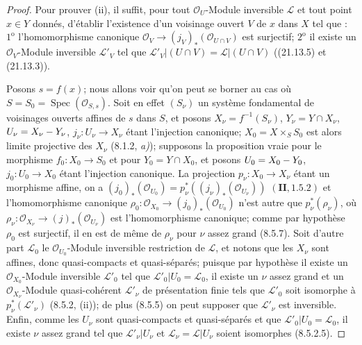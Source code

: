 \begin{proof}
Pour prouver (ii), il suffit, pour tout $\mathcal O_U$-Module inversible $\mathscr L$
et tout point $x\in Y$ donnés, d'établir l'existence d'un voisinage ouvert $V$ de $x$
dans $X$ tel que : $1^{\mathrm o}$ l'homomorphisme canonique
$\mathcal O_V\to(j_V)_*(\mathcal O_{U\cap V})$ est surjectif;
$2^{\mathrm o}$ il existe un $\mathcal O_V$-Module inversible $\mathscr L'_V$ tel que
$\mathscr L'_V|(U\cap V)=\mathscr L|(U\cap V)$ ((21.13.5) et (21.13.3)).

Posons $s=f(x)$; nous allons voir qu'on peut se borner au cas où
$S=S_0=\operatorname{Spec}(\mathcal O_{S,s})$. Soit en effet $(S_\nu)$ un système
fondamental de voisinages ouverts affines de $s$ dans $S$, et posons
$X_\nu=f^{-1}(S_\nu)$, $Y_\nu=Y\cap X_\nu$, $U_\nu=X_\nu- Y_\nu$,
$j_\nu:U_\nu\to X_\nu$ étant l'injection canonique; $X_0=X\times_S S_0$ est alors
limite projective des $X_\nu$ (8.1.2, \emph{a)}); supposons la proposition vraie pour le
morphisme $f_0:X_0\to S_0$ et pour $Y_0=Y\cap X_0$, et posons $U_0=X_0- Y_0$,
$j_0:U_0\to X_0$ étant l'injection canonique. La projection
$p_\nu:X_0\to X_\nu$ étant un morphisme affine, on a $(j_0)_*(\mathcal O_{U_0})=p_\nu^*((j_\nu)_*(\mathcal O_{U_\nu}))$
$(\mathbf{II}, 1.5.2)$ et l'homomorphisme canonique
$\rho_0:\mathcal O_{X_0}\to(j_0)_*(\mathcal O_{U_0})$ n'est autre que
$p_\nu^*(\rho_\nu)$, où
$\rho_\nu:\mathcal O_{X_\nu}\to(j)_*(\mathcal O_{U_\nu})$ est l'homomorphisme
canonique; comme par hypothèse $\rho_0$ est surjectif, il en est de même de $\rho_\nu$
pour $\nu$ assez
grand (8.5.7). Soit d'autre part $\mathscr L_0$ le
$\mathcal O_{U_0}$-Module inversible restriction de $\mathscr L$, et notons que les
$X_\nu$ sont affines, donc quasi-compacts et quasi-séparés; puisque par hypothèse il
existe un $\mathcal O_{X_0}$-Module inversible $\mathscr L'_0$ tel que
$\mathscr L'_0|U_0=\mathscr L_0$, il existe un $\nu$ assez grand et un
$\mathcal O_{X_\nu}$-Module quasi-cohérent $\mathscr L'_\nu$ de présentation finie
tels que $\mathscr L'_0$ soit isomorphe à $p_\nu^*(\mathscr L'_\nu)$ (8.5.2, (ii));
de plus (8.5.5) on peut supposer que $\mathscr L'_\nu$ est inversible. Enfin, comme
les $U_\nu$ sont quasi-compacts et quasi-séparés et que
$\mathscr L'_0|U_0=\mathscr L_0$, il existe $\nu$ assez grand tel que
$\mathscr L'_\nu|U_\nu$ et $\mathscr L_\nu=\mathscr L|U_\nu$ soient isomorphes (8.5.2.5).


\end{proof}
